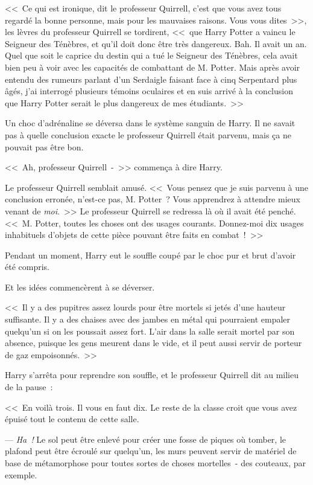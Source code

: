 <<~Ce qui est ironique, dit le professeur Quirrell, c'est que vous avez tous regardé la bonne personne, mais pour les mauvaises raisons. Vous vous dites~>>, les lèvres du professeur Quirrell se tordirent, <<~que Harry Potter a vaincu le Seigneur des Ténèbres, et qu'il doit donc être très dangereux. Bah. Il avait un an. Quel que soit le caprice du destin qui a tué le Seigneur des Ténèbres, cela avait bien peu à voir avec les capacités de combattant de M. Potter. Mais après avoir entendu des rumeurs parlant d'un Serdaigle faisant face à cinq Serpentard plus âgés, j'ai interrogé plusieurs témoins oculaires et en suis arrivé à la conclusion que Harry Potter serait le plus dangereux de mes étudiants.~>>

Un choc d'adrénaline se déversa dans le système sanguin de Harry. Il ne savait pas à quelle conclusion exacte le professeur Quirrell était parvenu, mais ça ne pouvait pas être bon.

<<~Ah, professeur Quirrell~-~>> commença à dire Harry.

Le professeur Quirrell semblait amusé. <<~Vous pensez que je suis parvenu à une conclusion erronée, n'est-ce pas, M. Potter~? Vous apprendrez à attendre mieux venant de \emph{moi}.~>> Le professeur Quirrell se redressa là où il avait été penché. <<~M. Potter, toutes les choses ont des usages courants. Donnez-moi dix usages inhabituels d'objets de cette pièce pouvant être faits en combat~!~>>

Pendant un moment, Harry eut le souffle coupé par le choc pur et brut d'avoir été compris.

Et les idées commencèrent à se déverser.

<<~Il y a des pupitres assez lourds pour être mortels si jetés d'une hauteur suffisante. Il y a des chaises avec des jambes en métal qui pourraient empaler quelqu'un si on les poussait assez fort. L'air dans la salle serait mortel par son absence, puisque les gens meurent dans le vide, et il peut aussi servir de porteur de gaz empoisonnés.~>>

Harry s'arrêta pour reprendre son souffle, et le professeur Quirrell dit au milieu de la pause~:

<<~En voilà trois. Il vous en faut dix. Le reste de la classe croit que vous avez épuisé tout le contenu de cette salle.

--- \emph{Ha~!} Le sol peut être enlevé pour créer une fosse de piques où tomber, le plafond peut être écroulé sur quelqu'un, les murs peuvent servir de matériel de base de métamorphose pour toutes sortes de choses mortelles~- des couteaux, par exemple.

